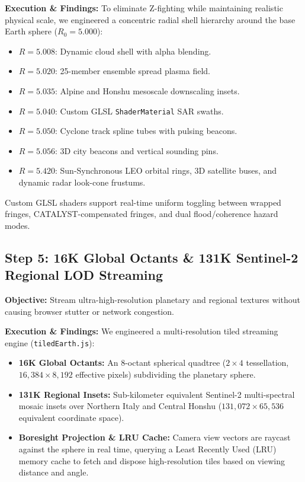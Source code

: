 \documentclass[10pt,twocolumn,letterpaper]{article}
\begin{document}
\textbf{Execution \& Findings:} To eliminate Z-fighting while maintaining realistic physical scale, we engineered a concentric radial shell hierarchy around the base Earth sphere ($R_0 = 5.000$):
\begin{itemize}[leftmargin=*,noitemsep,topsep=1pt]
    \item $R = 5.008$: Dynamic cloud shell with alpha blending.
    \item $R = 5.020$: 25-member ensemble spread plasma field.
    \item $R = 5.035$: Alpine and Honshu mesoscale downscaling insets.
    \item $R = 5.040$: Custom GLSL \texttt{ShaderMaterial} SAR swaths.
    \item $R = 5.050$: Cyclone track spline tubes with pulsing beacons.
    \item $R = 5.056$: 3D city beacons and vertical sounding pins.
    \item $R = 5.420$: Sun-Synchronous LEO orbital rings, 3D satellite buses, and dynamic radar look-cone frustums.
\end{itemize}
Custom GLSL shaders support real-time uniform toggling between wrapped fringes, CATALYST-compensated fringes, and dual flood/coherence hazard modes.

\subsection{Step 5: 16K Global Octants \& 131K Sentinel-2 Regional LOD Streaming}
\textbf{Objective:} Stream ultra-high-resolution planetary and regional textures without causing browser stutter or network congestion.

\textbf{Execution \& Findings:} We engineered a multi-resolution tiled streaming engine (\texttt{tiledEarth.js}):
\begin{itemize}[leftmargin=*,noitemsep,topsep=1pt]
    \item \textbf{16K Global Octants:} An 8-octant spherical quadtree ($2 \times 4$ tessellation, $16,384 \times 8,192$ effective pixels) subdividing the planetary sphere.
    \item \textbf{131K Regional Insets:} Sub-kilometer equivalent Sentinel-2 multi-spectral mosaic insets over Northern Italy and Central Honshu ($131,072 \times 65,536$ equivalent coordinate space).
    \item \textbf{Boresight Projection \& LRU Cache:} Camera view vectors are raycast against the sphere in real time, querying a Least Recently Used (LRU) memory cache to fetch and dispose high-resolution tiles based on viewing distance and angle.
\end{itemize}
\end{document}
